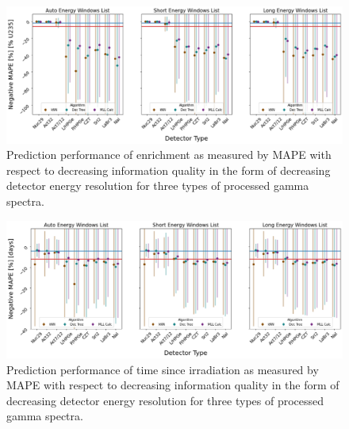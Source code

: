 \begin{figure}[!htb]
  \centering
  \includegraphics[width=\textwidth]{./chapters/exp2/detector_preds_wrt_enlist_MAPE_enri.png}
  \caption{Prediction performance of enrichment as measured by \gls{MAPE} with 
           respect to decreasing information quality in the form of decreasing 
           detector energy resolution for three types of processed gamma spectra.}
  \label{fig:enri}
\end{figure}

\begin{figure}[!htb]
  \centering
  \includegraphics[width=\textwidth]{./chapters/exp2/detector_preds_wrt_enlist_MAPE_cool.png}
  \caption{Prediction performance of time since irradiation as measured by \gls{MAPE} 
           with respect to decreasing information quality in the form of decreasing 
           detector energy resolution for three types of processed gamma spectra.}
  \label{fig:cool}
\end{figure}


